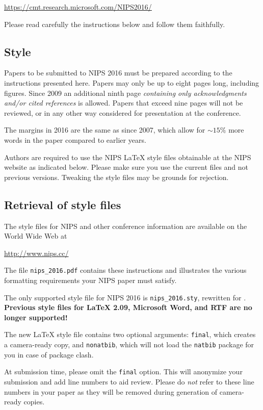 \documentclass{article}
\begin{document}
\begin{center}
  \url{https://cmt.research.microsoft.com/NIPS2016/}
\end{center}

Please read carefully the instructions below and follow them
faithfully.

\subsection{Style}

Papers to be submitted to NIPS 2016 must be prepared according to the
instructions presented here. Papers may only be up to eight pages
long, including figures. Since 2009 an additional ninth page
\emph{containing only acknowledgments and/or cited references} is
allowed. Papers that exceed nine pages will not be reviewed, or in any
other way considered for presentation at the conference.

The margins in 2016 are the same as since 2007, which allow for
$\sim$$15\%$ more words in the paper compared to earlier years.

Authors are required to use the NIPS \LaTeX{} style files obtainable
at the NIPS website as indicated below. Please make sure you use the
current files and not previous versions. Tweaking the style files may
be grounds for rejection.

\subsection{Retrieval of style files}

The style files for NIPS and other conference information are
available on the World Wide Web at
\begin{center}
  \url{http://www.nips.cc/}
\end{center}
The file \verb+nips_2016.pdf+ contains these instructions and
illustrates the various formatting requirements your NIPS paper must
satisfy.

The only supported style file for NIPS 2016 is \verb+nips_2016.sty+,
rewritten for \LaTeXe{}.  \textbf{Previous style files for \LaTeX{}
  2.09, Microsoft Word, and RTF are no longer supported!}

The new \LaTeX{} style file contains two optional arguments:
\verb+final+, which creates a camera-ready copy, and \verb+nonatbib+,
which will not load the \verb+natbib+ package for you in case of
package clash.

At submission time, please omit the \verb+final+ option. This will
anonymize your submission and add line numbers to aid review.  Please
do \emph{not} refer to these line numbers in your paper as they will
be removed during generation of camera-ready copies.
\end{document}
